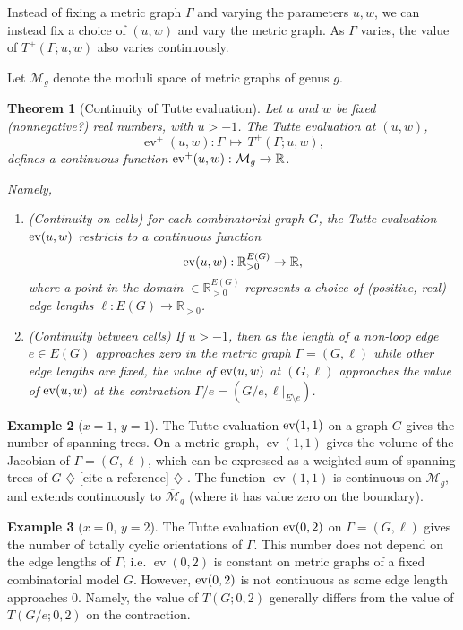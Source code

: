 \documentclass{amsart}
\newtheorem{thm}{Theorem}
\theoremstyle{definition}
\newtheorem{eg}[thm]{Example}
\newcommand{\RR}{\mathbb{R}}
\newcommand{\RRpos}{\RR_{>0}}
\DeclareMathOperator{\ev}{ev}
\newcommand{\harry}[1]{{\color{red} \sf $\diamondsuit$  {#1} $\diamondsuit$ }}
\newcommand{\note}[1]{\harry{#1}}
\begin{document}
Instead of fixing a metric graph $\Gamma$ and varying the parameters $u,w$,
we can instead fix a choice of $(u,w)$ and vary the metric graph.
As $\Gamma$ varies, the value of $T^+(\Gamma;u,w)$ also varies continuously.

Let $\mathcal M_g$ denote the moduli space of metric graphs of genus $g$.
\begin{thm}[Continuity of Tutte evaluation]
\label{thm:tutte-eval-moduli}
Let $u$ and $w$ be fixed (nonnegative?) real numbers,
with $u > -1$.
The Tutte evaluation at $(u,w)$,
$$ \ev^+(u,w) : \Gamma \,\mapsto\, T^+(\Gamma; u,w) ,$$
defines a continuous function  
${\rm ev}^+(u,w) : \mathcal M_g \to \RR$.

Namely, 
\begin{enumerate}
\item 
(Continuity on cells)
for each combinatorial graph $G$,
the Tutte evaluation 
${\rm ev}(u,w) $ 
restricts to a continuous function
$$ {\rm ev}(u,w) : \RRpos^{E(G)} \to \RR,$$ 
where a point in the domain $ \in \RRpos^{E(G)}$
represents a choice of (positive, real) edge lengths  $\ell : E(G) \to \RRpos$.

\item 
(Continuity between cells)
If $u > -1$, then as the length of a  non-loop edge $e \in E(G)$ approaches zero
in the metric graph $\Gamma = (G,\ell)$
while other edge lengths are fixed,
the value of 
${\rm ev}(u,w)$
at $(G,\ell)$ %
approaches the value of ${\rm ev}(u,w)$ at the contraction 
$\Gamma / e = (G / e, \ell \big|_{E\setminus e})$.
\end{enumerate}
\end{thm}

\begin{eg}
[$x = 1$, $y=1$]
The Tutte evaluation ${\rm ev}(1,1)$ 
on a graph $G$ gives the number of spanning trees.
On a metric graph, $\ev(1,1)$ gives the volume of the Jacobian of
$\Gamma = (G,\ell)$,
which can be expressed as a weighted sum of spanning trees of $G$ \note{[cite a reference]}.
The function $\ev(1,1)$ is continuous on $\mathcal M_g$, 
and extends continuously to $\overline{\mathcal M}_g$ 
(where it has value zero on the boundary).
\end{eg}
\begin{eg}
[$x = 0$, $y=2$]
The Tutte evaluation ${\rm ev}(0,2)$ 
on $\Gamma = (G,\ell)$ gives the number of totally cyclic orientations of $\Gamma$.
This number does not depend on the edge lengths of $\Gamma$;
i.e. $\ev(0,2)$
 is constant on metric graphs %
of a fixed combinatorial model $G$.
However, ${\rm ev}(0,2)$ is not continuous as some edge length approaches $0$.
Namely, the value of $T(G; 0, 2)$ generally differs from the value of $T(G/e; 0,2)$
on the contraction.
\end{eg}
\end{document}
